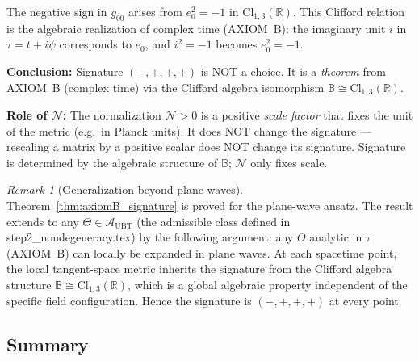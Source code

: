 \documentclass[12pt]{article}
\theoremstyle{definition}
\theoremstyle{remark}
\newtheorem{remark}[theorem]{Remark}
\begin{document}
\begin{tcolorbox}[colback=green!5!white,colframe=green!75!black,title=Key Insight: AXIOM B is the Source of Lorentzian Signature]
The negative sign in $g_{00}$ arises from $e_0^2 = -1$ in $\mathrm{Cl}_{1,3}(\mathbb{R})$.
This Clifford relation is the algebraic realization of complex time (AXIOM~B):
the imaginary unit $i$ in $\tau = t + i\psi$ corresponds to $e_0$, and
$i^2 = -1$ becomes $e_0^2 = -1$.

\medskip
\textbf{Conclusion:} Signature $(-,+,+,+)$ is NOT a choice.
It is a \emph{theorem} from AXIOM~B (complex time) via the Clifford algebra isomorphism
$\mathbb{B}\cong\mathrm{Cl}_{1,3}(\mathbb{R})$.

\medskip
\textbf{Role of $\mathcal{N}$:} The normalization $\mathcal{N} > 0$ is a positive
\emph{scale factor} that fixes the unit of the metric (e.g.\ in Planck units).
It does NOT change the signature — rescaling a matrix by a positive scalar
does NOT change its signature.  Signature is determined by the algebraic structure
of $\mathbb{B}$; $\mathcal{N}$ only fixes scale.
\end{tcolorbox}

\begin{remark}[Generalization beyond plane waves]
Theorem~\ref{thm:axiomB_signature} is proved for the plane-wave ansatz.
The result extends to any $\Theta\in\mathcal{A}_{\mathrm{UBT}}$ (the admissible class
defined in step2\_nondegeneracy.tex) by the following argument: any $\Theta$ analytic in
$\tau$ (AXIOM~B) can locally be expanded in plane waves.  At each spacetime point,
the local tangent-space metric inherits the signature from the Clifford algebra
structure $\mathbb{B}\cong\mathrm{Cl}_{1,3}(\mathbb{R})$, which is a global algebraic
property independent of the specific field configuration.  Hence the signature
is $(-,+,+,+)$ at every point.
\end{remark}

\subsection{Summary}
\end{document}
